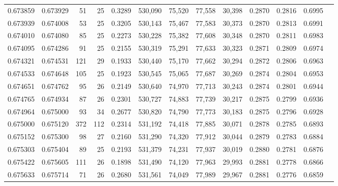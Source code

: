 \begin{tabular}{rrrrrrrrrrrrr}
0.673859 & 0.673929 &     51 &    25 &                                     0.3289 & 530,090 &  75,520 &  77,558 &  30,398 & 0.2870 & 0.2816 & 0.6995 \\
0.673939 & 0.674008 &     53 &    25 &                                     0.3205 & 530,143 &  75,467 &  77,583 &  30,373 & 0.2870 & 0.2813 & 0.6991 \\
0.674010 & 0.674080 &     85 &    25 &                                     0.2273 & 530,228 &  75,382 &  77,608 &  30,348 & 0.2870 & 0.2811 & 0.6983 \\
0.674095 & 0.674286 &     91 &    25 &                                     0.2155 & 530,319 &  75,291 &  77,633 &  30,323 & 0.2871 & 0.2809 & 0.6974 \\
0.674321 & 0.674531 &    121 &    29 &                                     0.1933 & 530,440 &  75,170 &  77,662 &  30,294 & 0.2872 & 0.2806 & 0.6963 \\
0.674533 & 0.674648 &    105 &    25 &                                     0.1923 & 530,545 &  75,065 &  77,687 &  30,269 & 0.2874 & 0.2804 & 0.6953 \\
0.674651 & 0.674762 &     95 &    26 &                                     0.2149 & 530,640 &  74,970 &  77,713 &  30,243 & 0.2874 & 0.2801 & 0.6944 \\
0.674765 & 0.674934 &     87 &    26 &                                     0.2301 & 530,727 &  74,883 &  77,739 &  30,217 & 0.2875 & 0.2799 & 0.6936 \\
0.674964 & 0.675000 &     93 &    34 &                                     0.2677 & 530,820 &  74,790 &  77,773 &  30,183 & 0.2875 & 0.2796 & 0.6928 \\
0.675000 & 0.675120 &    372 &   112 &                                     0.2314 & 531,192 &  74,418 &  77,885 &  30,071 & 0.2878 & 0.2785 & 0.6893 \\
0.675152 & 0.675300 &     98 &    27 &                                     0.2160 & 531,290 &  74,320 &  77,912 &  30,044 & 0.2879 & 0.2783 & 0.6884 \\
0.675303 & 0.675404 &     89 &    25 &                                     0.2193 & 531,379 &  74,231 &  77,937 &  30,019 & 0.2880 & 0.2781 & 0.6876 \\
0.675422 & 0.675605 &    111 &    26 &                                     0.1898 & 531,490 &  74,120 &  77,963 &  29,993 & 0.2881 & 0.2778 & 0.6866 \\
0.675633 & 0.675714 &     71 &    26 &                                     0.2680 & 531,561 &  74,049 &  77,989 &  29,967 & 0.2881 & 0.2776 & 0.6859 \\

\end{tabular}
